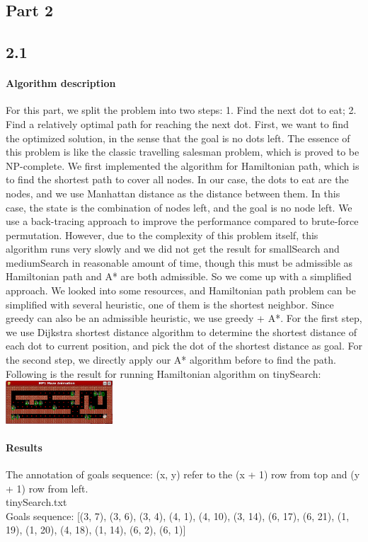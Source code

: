 \begin{multicols*}{2}
\section{Part 2}
\subsection*{2.1}
\paragraph{Algorithm description}
For this part, we split the problem into two steps: 1. Find the next dot to eat; 2. Find a relatively optimal path for reaching the next dot.
First, we want to find the optimized solution, in the sense that the goal is no dots left. The essence of this problem is like the classic travelling salesman problem, which is proved to be NP-complete. We first implemented the algorithm for Hamiltonian path, which is to find the shortest path to cover all nodes. In our case, the dots to eat are the nodes, and we use Manhattan distance as the distance between them. In this case, the state is the combination of nodes left, and the goal is no node left. We use a back-tracing approach to improve the performance compared to brute-force permutation. However, due to the complexity of this problem itself, this algorithm runs very slowly and we did not get the result for smallSearch and mediumSearch in reasonable amount of time, though this must be admissible as Hamiltonian path and A* are both admissible. 
So we come up with a simplified approach. We looked into some resources, and Hamiltonian path problem can be simplified with several heuristic, one of them is the shortest neighbor. Since greedy can also be an admissible heuristic, we use greedy + A*. 
For the first step, we use Dijkstra shortest distance algorithm to determine the shortest distance of each dot to current position, and pick the dot of the shortest distance as goal.
For the second step, we directly apply our A* algorithm before to find the path.\\
Following is the result for running Hamiltonian algorithm on tinySearch:\\
\includegraphics[width=0.3\textwidth]{graphics/ham.png}
\paragraph{Results}
The annotation of goals sequence: (x, y) refer to the (x + 1) row from top and (y + 1) row from left.\\
tinySearch.txt\\
 Goals sequence:
 [(3, 7), (3, 6), (3, 4), (4, 1), (4, 10), (3, 14), (6, 17), (6, 21), (1, 19), (1, 20), (4, 18), (1, 14), (6, 2), (6, 1)]


\end{multicols*}
